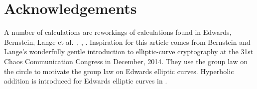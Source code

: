 \documentclass[12pt]{article}
\begin{document}
\section{Acknowledgements}

A number of calculations are reworkings of calculations found in
Edwards, Bernstein, Lange et al.~\cite{edwards2007normal},
\cite{bernstein2008twisted}, \cite{bernstein2007faster}.  Inspiration
for this article comes from Bernstein and Lange's wonderfully gentle
introduction to elliptic-curve cryptography at the 31st Chaos
Communication Congress in December, 2014.  They use the group law on
the circle to motivate the group law on Edwards elliptic curves.
Hyperbolic addition is introduced for Edwards elliptic curves in
\cite{arene2011faster}.  

 

\end{document}
